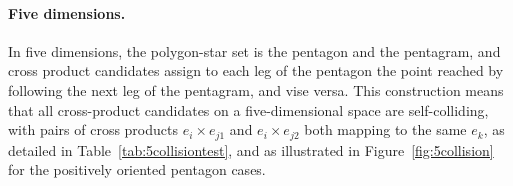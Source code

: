 \documentclass[11pt]{article}
\newcommand{\bv}[1][]{e_{#1}}
\begin{document}
\clearpage


\paragraph{Five dimensions.}
In five dimensions, the polygon-star set is the pentagon and the pentagram, and cross product candidates assign to each leg of the pentagon the point reached by following the next leg of the pentagram, and vise versa. This construction means that all cross-product candidates on a five-dimensional space are self-colliding, with pairs of cross products $\bv[i]\times\bv[j1]$ and $\bv[i]\times\bv[j2]$ both mapping to the same $\bv[k]$, as  detailed in Table~\ref{tab:5collisiontest}, and as illustrated in Figure~\ref{fig:5collision} for the positively oriented pentagon cases.
%
\end{document}
